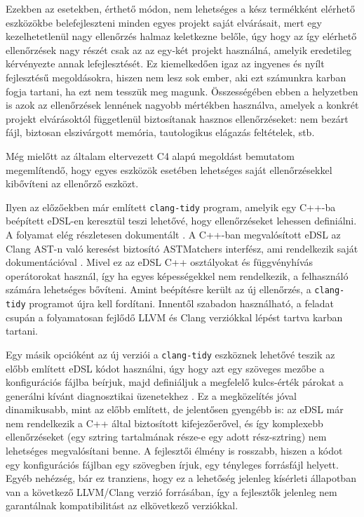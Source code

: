 Ezekben az esetekben, érthető módon, nem lehetséges a kész termékként elérhető eszközökbe belefejleszteni minden egyes projekt saját elvárásait, mert egy kezelhetetlenül nagy ellenőrzés halmaz keletkezne belőle, úgy hogy az így elérhető ellenőrzések nagy részét csak az az egy-két projekt használná, amelyik eredetileg kérvényezte annak lefejlesztését.
Ez kiemelkedően igaz az ingyenes és nyílt fejlesztésű megoldásokra, hiszen nem lesz sok ember, aki ezt számunkra karban fogja tartani, ha ezt nem tesszük meg magunk.
Összességében ebben a helyzetben is azok az ellenőrzések lennének nagyobb mértékben használva, amelyek a konkrét projekt elvárásoktól függetlenül biztosítanak hasznos ellenőrzéseket: nem bezárt fájl, biztosan elszivárgott memória, tautologikus elágazás feltételek, stb.

Még mielőtt az általam eltervezett C4 alapú megoldást bemutatom megemlítendő, hogy egyes eszközök esetében lehetséges saját ellenőrzésekkel kibővíteni az ellenőrző eszközt.

Ilyen az előzőekben már említett {\tt clang-tidy} program, amelyik egy C++-ba beépített \gls{eDSL}-en keresztül teszi lehetővé, hogy ellenőrzéseket lehessen definiálni.
A folyamat elég részletesen dokumentált \cite{llvmprojectGettingInvolvedExtra2025}.
A C++-ban megvalósított \gls{eDSL} az Clang \gls{AST}-n való keresést biztosító \gls{AST}Matchers interfész, ami rendelkezik saját dokumentációval \cite{llvmprojectASTMatcherReference2025}.
Mivel ez az \gls{eDSL} C++ osztályokat és függvényhívás operátorokat használ, így ha egyes képességekkel nem rendelkezik, a felhasználó számára lehetséges bővíteni.
Amint beépítésre került az új ellenőrzés, a {\tt clang-tidy} programot újra kell fordítani.
Innentől szabadon használható, a feladat csupán a folyamatosan fejlődő LLVM és Clang verziókkal lépést tartva karban tartani.

Egy másik opcióként az új verziói a {\tt clang-tidy} eszköznek lehetővé teszik az előbb említett \gls{eDSL} kódot használni, úgy hogy azt egy szöveges mezőbe a konfigurációs fájlba beírjuk, majd definiáljuk a megfelelő kulcs-érték párokat a generálni kívánt diagnosztikai üzenetekhez \cite{llvmprojectQueryBasedCustom2025}.
Ez a megközelítés jóval dinamikusabb, mint az előbb említett, de jelentősen gyengébb is: az \gls{eDSL} már nem rendelkezik a C++ által biztosított kifejezőerővel, és így komplexebb ellenőrzéseket (\pl egy sztring tartalmának része-e egy adott rész-sztring) nem lehetséges megvalósítani benne.
A fejlesztői élmény is rosszabb, hiszen a kódot egy konfigurációs fájlban egy szövegben írjuk, egy tényleges forrásfájl helyett.
Egyéb nehézség, bár ez tranziens, hogy ez a lehetőség jelenleg kísérleti állapotban van a következő LLVM/Clang verzió forrásában, így a fejlesztők jelenleg nem garantálnak kompatibilitást az elkövetkező verziókkal.

